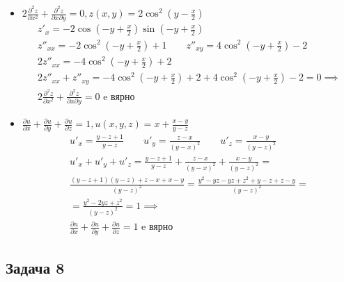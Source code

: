 \documentclass[a4paper,fleqn,12pt]{article}
\theoremstyle{definition}
\begin{document}
\begin{itemize}
\item $2 \frac{\partial^2 z}{\partial x^2 } + \frac{\partial^2 z}{\partial x \partial y} = 0, z(x,y) = 2\cos^2(y - \frac{x}{2})$
\begin{gather*}
z'_x = -2 \cos \left (-y + \frac{x}{2} \right) \sin \left (-y + \frac{x}{2} \right) \\
z''_{xx} = -2 \cos^2 \left (-y + \frac{x}{2} \right) + 1 \qquad z''_{xy} = 4 \cos^2 \left (-y + \frac{x}{2} \right) - 2 \\
2z''_{xx} = -4 \cos^2 \left (-y + \frac{x}{2} \right) + 2 \\
2z''_{xx} + z''_{xy} = -4 \cos^2 \left (-y + \frac{x}{2} \right) + 2 + 4 \cos^2 \left (-y + \frac{x}{2} \right) - 2 = 0 \implies \\
2 \frac{\partial^2 z}{\partial x^2 } + \frac{\partial^2 z}{\partial x \partial y} = 0 \text{ e вярно}
\end{gather*}
\item $\frac{\partial u}{\partial x} + \frac{\partial u}{\partial y} + \frac{\partial u}{\partial z} = 1, u(x,y,z) = x + \frac{x-y}{y-z}$ 
\begin{gather*}
u'_x = \frac{y-z+1}{y-z} \qquad u'_y = \frac{z-x}{(y-x)^2} \qquad u'_z = \frac{x-y}{(y-z)^2} \\
u'_x + u'_y + u'_z = \frac{y-z+1}{y-z} + \frac{z-x}{(y-x)^2} + \frac{x-y}{(y-z)^2} = \\
\frac{(y-z+1)(y-z) +z-x + x-y}{(y-z)^2} = \frac{y^2 - yz -yz + z^2 +y- z +z -y}{(y-z)^2} = \\ = \frac{y^2 -2yz + z^2}{(y-z)^2} = 1 \implies \\
\frac{\partial u}{\partial x} + \frac{\partial u}{\partial y} + \frac{\partial u}{\partial z} = 1 \text{ e вярно}
\end{gather*}
\end{itemize}

\subsection*{Задача 8}
\end{document}
